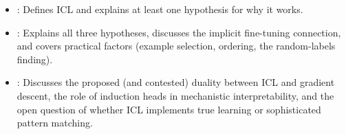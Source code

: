 \begin{interviewq}

\goodgreat
\begin{itemize}
\item {}: Defines ICL and explains at least one hypothesis
  for why it works.
\item {}: Explains all three hypotheses, discusses the
  implicit fine-tuning connection, and covers practical factors (example
  selection, ordering, the random-labels finding).
\item {}: Discusses the proposed (and contested) duality
  between ICL and gradient descent, the role of induction heads in
  mechanistic interpretability, and the open question of whether ICL
  implements true learning or sophisticated pattern matching.
\end{itemize}

\end{interviewq}

